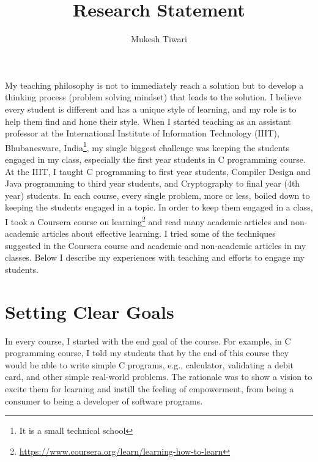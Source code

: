 \documentclass[a4paper]{article}
\title{Research Statement}
\author{Mukesh Tiwari}
\date{}
\begin{document}
\fontsize{11}{15}
\selectfont
\maketitle


My teaching philosophy is not to immediately reach a solution but to develop a 
thinking process (problem solving mindset) that leads to the solution. I believe every 
student is different and has a unique style of learning, and my role is to help them find 
and hone their style. When I started teaching as an assistant professor at the International Institute of Information 
Technology (IIIT), Bhubanesware, India\footnote{It is a small technical school},
my single biggest challenge was keeping the students engaged in my class, especially the first year 
students in C programming course. At the IIIT, I taught C programming to 
first year students, Compiler Design and Java programming to third year students, and
Cryptography to final year (4th year) students. In each course, every single 
problem,  more or less, boiled down to keeping the students engaged in a topic. 
In order to keep them engaged in a class, I took a Coursera course on 
learning\footnote{\url{https://www.coursera.org/learn/learning-how-to-learn}} and 
read many academic articles and non-academic articles about effective learning.
I tried some of the techniques suggested in the Coursera course and 
academic and non-academic articles in my classes. Below I 
describe my experiences with teaching and efforts to engage my students. 


\section{Setting Clear Goals}
In every course, I started with the end goal of the course. For example, 
in C programming course, I told my students that by the end of this 
course they would be 
able to write simple C programs, e.g., calculator, 
validating a debit card, and other simple real-world problems. The rationale was 
to show a vision to excite them 
for learning and instill the feeling of empowerment, from
being a consumer to being a developer of software programs.
\end{document}
